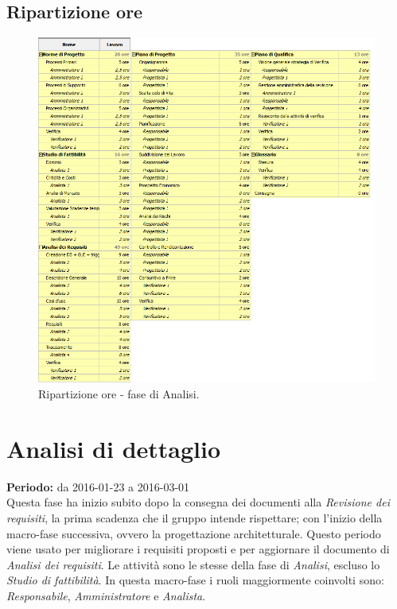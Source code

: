 \documentclass[a4paper]{report}
\begin{document}
			\subsection{Ripartizione ore}
				\begin{figure}[H]
					\centering
					\includegraphics[scale=0.6]{ROAnalisi}
					\caption{Ripartizione ore - fase di Analisi.}
				\end{figure}

		\section{Analisi di dettaglio}
			\textbf{Periodo:} da 2016-01-23 a 2016-03-01 \\
			Questa fase ha inizio subito dopo la consegna dei documenti alla \emph{Revisione dei requisiti}, la
			prima scadenza che il gruppo intende rispettare; con l'inizio della macro-fase successiva, ovvero la 
			progettazione architetturale.
			Questo periodo viene usato per migliorare i requisiti proposti e per aggiornare il documento di 
			\emph{Analisi dei requisiti}. 
			Le attività sono le stesse della fase di \emph{Analisi}, escluso lo \emph{Studio di fattibilità}. 
			In questa macro-fase i ruoli maggiormente coinvolti sono: \emph{Responsabile}, \emph{Amministratore} 
			e \emph{Analista}.
\end{document}
